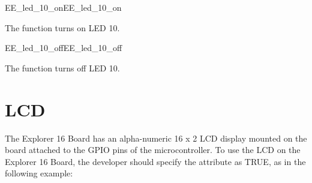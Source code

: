 \begin{function_nopb2}{EE\_led\_10\_on}{EE_led_10_on}
  
  \begin{fundescription}
    The function turns on LED 10.
  \end{fundescription}
  
  
  
\end{function_nopb2}

\begin{function_nopb2}{EE\_led\_10\_off}{EE_led_10_off}
  
  \begin{fundescription}
    The function turns off LED 10.
  \end{fundescription}
  
  
  
\end{function_nopb2}



\section{LCD}

The Explorer 16 Board has an alpha-numeric 16 x 2 LCD display mounted
on the board attached to the GPIO pins of the microcontroller. To use
the LCD on the Explorer 16 Board, the developer should specify the
 attribute as TRUE, as in the following example:

